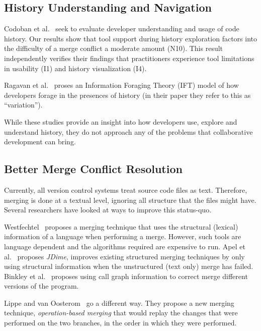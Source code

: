 \subsection{History Understanding and Navigation}

Codoban et al.~\cite{Mihai_lenses} seek to evaluate developer understanding and usage of code history. 
Our results show that tool support during history exploration factors into the difficulty of a merge conflict a moderate amount (N10). 
This result independently verifies their findings that practitioners experience tool limitations in usability (I1) and history visualization (I4).

Ragavan et al.~\cite{ragavan_pfis-v_2017} proses an Information Foraging Theory (IFT) model of how developers forage in the presences of history (in their paper they refer to this as ``variation'').

While these studies provide an insight into how developers use, explore and understand history, they do not approach any of the problems that collaborative development can bring.


\subsection{Better Merge Conflict Resolution}

Currently, all version control systems treat source code files as text.
Therefore, merging is done at a textual level, ignoring all structure that the files might have.
Several researchers have looked at ways to improve this status-quo.

Westfechtel~\cite{westfechtel_structure-oriented_1991} proposes a merging technique that uses the structural (lexical) information of a language when performing a merge. However, such tools are language dependent and the algorithms required are expensive to run.
Apel et al.~\cite{apel_structured_2012-1, apel_semistructured_2011} proposes \emph{JDime}, improves existing structured merging techniques by only using structural information when the unstructured (text only) merge has failed.
Binkley et al.~\cite{binkley_program_1995} proposes using call graph information to correct merge different versions of the program.

Lippe and van Oosterom~\cite{lippe_operation-based_1992} go a different way. They propose a new merging technique, \emph{operation-based merging} that would replay the changes that were performed on the two branches, in the order in which they were performed.

